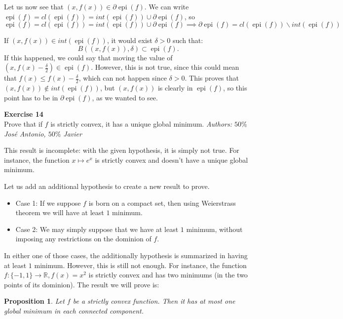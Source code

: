 \documentclass[11pt,table]{article}
\newenvironment{problem}[2][Exercise]
{ \begin{mdframed}[backgroundcolor=gray!20] \textbf{#1 #2} \\}
	{\hspace{0.0cm}\newline\newline \emph{Authors: \(50\%\) José Antonio, \(50\%\) Javier}  \end{mdframed}}
\newtheorem{nprop}{Proposition}
\newcommand\R{\mathbb R}
\begin{document}
Let us now see that \((x,f(x)) \in \partial \operatorname{epi}(f)\). We can write \(\operatorname{epi}(f) = cl(\operatorname{epi}(f)) = int(\operatorname{epi}(f)) \cup \partial \operatorname{epi}(f)\), so
\[
	\operatorname{epi}(f) = cl(\operatorname{epi}(f)) = int(\operatorname{epi}(f)) \cup \partial \operatorname{epi}(f)	\implies \partial \operatorname{epi}(f) = cl(\operatorname{epi}(f)) \backslash int(\operatorname{epi}(f))
\]

If \((x,f(x)) \in int(\operatorname{epi}(f))\), it would exist \(\delta > 0\) such that:
\[
	B((x,f(x)),\delta) \subset \operatorname{epi}(f).
\]
If this happened, we could say that moving the value of  \((x,f(x)- \frac{\delta}{2}) \in \operatorname{epi}(f) \). However, this is not true, since this could mean that \(f(x) \leq f(x) - \frac{\delta}{2}\), which can not happen since \(\delta > 0\). This proves that \((x,f(x))\notin int(\operatorname{epi}(f))\), but \((x,f(x))\) is clearly in \(\operatorname{epi}(f)\), so this point has to be in \(\partial \operatorname{epi}(f)\), as we wanted to see.

\begin{problem}{14}
Prove that if \( f \)  is strictly convex, it has a unique global minimum.
\end{problem}

This result is incomplete: with the given hypothesis, it is simply not true. For instance, the function $x \mapsto e^x$ is strictly convex and doesn't have a unique global minimum.

Let us add an additional hypothesis to create a new result to prove.

\begin{itemize}
	\item Case 1: If we suppose $f$ is born on a compact set, then using Weierstrass theorem we will have at least $1$ minimum.
	\item Case 2: We may simply suppose that we have at least $1$ minimum, without imposing any restrictions on the dominion of $f$.
\end{itemize}

In either one of those cases, the additionally hypothesis is summarized in having at least $1$ minimum. However, this is still not enough. For instance, the function $f:\{-1,1\} \rightarrow \R, f(x) = x^2$ is strictly convex and has two minimums (in the two points of its dominion). The result we will prove is:

\begin{nprop}
	Let \( f \) be a strictly convex function. Then  it has at most one global minimum in each connected component.
\end{nprop}
\end{document}
